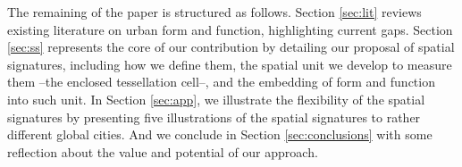 The remaining of the paper is structured as follows. Section \ref{sec:lit}
reviews existing literature on urban form and function, highlighting current
gaps. Section \ref{sec:ss} represents the core of our contribution by detailing
our proposal of spatial signatures,
including how we define them, the spatial unit we develop to
measure them --the enclosed tessellation cell--, and the embedding of form and
function into such unit. In Section \ref{sec:app}, we illustrate the
flexibility of the spatial signatures by presenting five illustrations of the
spatial signatures to rather different global cities. And we conclude in Section
\ref{sec:conclusions} with some reflection about the value and potential of
our approach.









